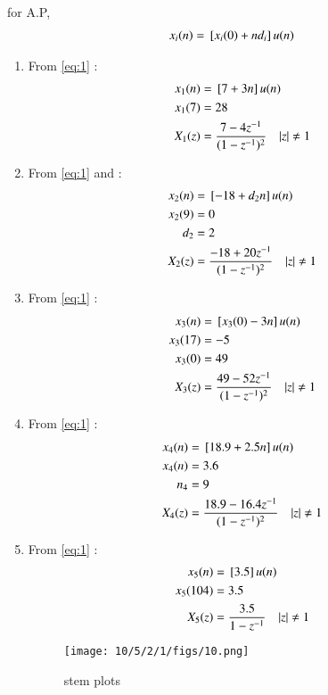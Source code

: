 \documentclass[journal,12pt,twocolumn]{IEEEtran}
\theoremstyle{remark}
\begin{document}
\begin{table}[h!]
  \centering
  
   \label{tab:Table1}
\end{table}
\solution
for A.P,
\begin{align}
    x_i(n) = {}\left[x_i(0) + nd_i\right] u(n)
    \label{eq:1}
\end{align}
\begin{enumerate}
\item From \eqref{eq:1}  :
\begin{align}
x_1(n) &= {}\left[7+3n\right]u(n)\\
x_1(7) &= 28\\
X_1(z) &= \frac{7 - 4z^{-1}}{(1 - z^{-1})^2} \quad |z| \neq 1
\end{align}
\item From \eqref{eq:1} and  :
\begin{align}
x_2(n) &= {}\left[-18 + d_2n\right]u(n)\\
x_2(9) &= 0\\
d_2 &= 2\\
X_2(z) &= \frac{-18 + 20z^{-1}}{(1 - z^{-1})^2}
 \quad |z| \neq 1
\end{align}
\item From \eqref{eq:1}  :
\begin{align}
x_3(n) &= {}\left[x_3(0)-3n\right]u(n)\\
x_3(17) &= -5\\
x_3(0) &= 49\\
X_3(z) &= \frac{49 - 52z^{-1}}{(1 - z^{-1})^2}
 \quad |z| \neq 1
\end{align}
\item From \eqref{eq:1}  :
\begin{align}
x_4(n) &= {}\left[18.9+2.5n\right]u(n)\\
x_4(n) &= 3.6\\
n_4    &= 9\\
X_4(z) &= \frac{18.9 - 16.4z^{-1}}{(1 - z^{-1})^2}
 \quad |z| \neq 1
\end{align}
\item From \eqref{eq:1}  :
\begin{align}
x_5(n) &= {}\left[3.5\right]u(n)\\
x_5(104) &= 3.5\\
X_5(z) &= \frac{3.5}{1-z^{-1}} \quad |z| \neq 1
\end{align}
\begin{figure}[h!]
    \centering
    \texttt{[image: 10/5/2/1/figs/10.png]}
    \caption{stem plots }
    \label{fig:1}
\end{figure}
\end{enumerate}
\end{document}
